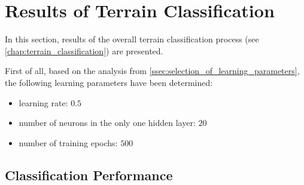 \section{Results of Terrain Classification} \label{sec:terrain_processing_results}
In this section, results of the overall terrain classification process (see \cref{chap:terrain_classification}) are presented.  

First of all, based on the analysis from \cref{ssec:selection_of_learning_parameters}, the following learning parameters have been determined:

\begin{itemize}
\item learning rate: $ 0.5 $
\item number of neurons in the only one hidden layer: $ 20 $
\item number of training epochs: $ 500 $
\end{itemize}

\subsection{Classification Performance} \label{ssec:classification_performance}

